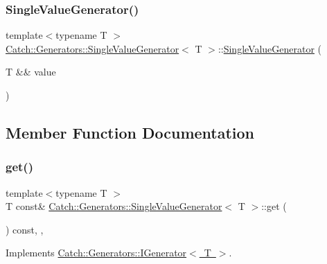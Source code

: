 \subsubsection{\texorpdfstring{SingleValueGenerator()}{SingleValueGenerator()}\hspace{0.1cm}{\footnotesize\ttfamily [2/2]}}
{\footnotesize\ttfamily template$<$typename T $>$ \\
\mbox{\hyperlink{class_catch_1_1_generators_1_1_single_value_generator}{Catch\+::\+Generators\+::\+Single\+Value\+Generator}}$<$ T $>$\+::\mbox{\hyperlink{class_catch_1_1_generators_1_1_single_value_generator}{Single\+Value\+Generator}} (\begin{DoxyParamCaption}\item[{T \&\&}]{value }\end{DoxyParamCaption})\hspace{0.3cm}{\ttfamily [inline]}}



\subsection{Member Function Documentation}
\mbox{\label{class_catch_1_1_generators_1_1_single_value_generator_a5142058c52131a2471e7307972f99b50}} 
\subsubsection{\texorpdfstring{get()}{get()}}
{\footnotesize\ttfamily template$<$typename T $>$ \\
T const\& \mbox{\hyperlink{class_catch_1_1_generators_1_1_single_value_generator}{Catch\+::\+Generators\+::\+Single\+Value\+Generator}}$<$ T $>$\+::get (\begin{DoxyParamCaption}{ }\end{DoxyParamCaption}) const\hspace{0.3cm}{\ttfamily [inline]}, {\ttfamily [override]}, {\ttfamily [virtual]}}



Implements \mbox{\hyperlink{struct_catch_1_1_generators_1_1_i_generator_a525d381fc9249a885b075a0632a8579a}{Catch\+::\+Generators\+::\+I\+Generator$<$ T $>$}}.

